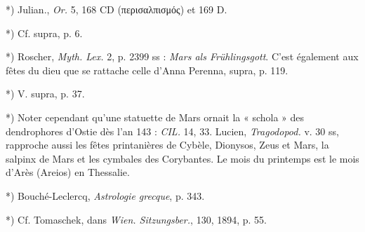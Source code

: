 \documentclass[a4paper, 11pt, oneside, polutonikogreek, french]{article}
\begin{document}
*) Julian., \emph{Or.} 5, 168 CD (περισαλπισμός) et 169 D.

*) Cf. supra, p. 6.

*) Roscher, \emph{Myth. Lex.} 2, p. 2399 ss : \emph{Mars als Frühlingsgott}. C'est également aux fêtes du dieu que se rattache celle d'Anna Perenna, supra, p. 119.

*) V. supra, p. 37.

*) Noter cependant qu'une statuette de Mars ornait la « schola » des dendrophores d'Ostie dès l'an 143 : \emph{CIL.} 14, 33. Lucien, \emph{Tragodopod.} v. 30 ss, rapproche aussi les fêtes printanières de Cybèle, Dionysos, Zeus et Mars, la salpinx de Mars et les cymbales des Corybantes. Le mois du printemps est le mois d'Arès (Areios) en Thessalie.

*) Bouché-Leclercq, \emph{Astrologie grecque}, p. 343.

*) Cf. Tomaschek, dans \emph{Wien. Sitzungsber.}, 130, 1894, p. 55.
\end{document}
